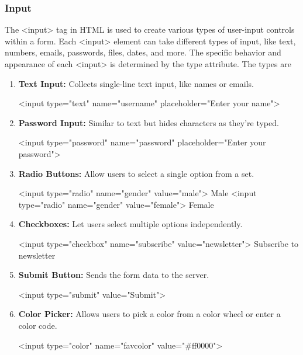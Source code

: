 \documentclass{report}
\begin{document}
\subsubsection{Input}
\bigbreak \noindent 
The <input> tag in HTML is used to create various types of user-input controls within a form. Each <input> element can take different types of input, like text, numbers, emails, passwords, files, dates, and more. The specific behavior and appearance of each <input> is determined by the type attribute.
\bigbreak \noindent 
The types are
\bigbreak \noindent 
        \begin{enumerate}
            \item \textbf{Text Input:} Collects single-line text input, like names or emails.
                \bigbreak \noindent 
                \begin{htmlcode}
                    <input type="text" name="username" placeholder="Enter your name">
                \end{htmlcode}
            \item \textbf{Password Input:} Similar to text but hides characters as they’re typed.
                \bigbreak \noindent 
                \begin{htmlcode}
                 <input type="password" name="password" placeholder="Enter your password">
                \end{htmlcode}
            \item \textbf{Radio Buttons:} Allow users to select a single option from a set.
                \bigbreak \noindent 
                \begin{htmlcode}
                    <input type="radio" name="gender" value="male"> Male
                    <input type="radio" name="gender" value="female"> Female
                \end{htmlcode}
            \item \textbf{Checkboxes:} Let users select multiple options independently.
                \bigbreak \noindent 
                \begin{htmlcode}
                 <input type="checkbox" name="subscribe" value="newsletter"> Subscribe to newsletter
                \end{htmlcode}
            \item \textbf{Submit Button:} Sends the form data to the server.
                \bigbreak \noindent 
                \begin{htmlcode}
                    <input type="submit" value="Submit">
                \end{htmlcode}
            \item \textbf{Color Picker:} Allows users to pick a color from a color wheel or enter a color code.
                \bigbreak \noindent 
                \begin{htmlcode}
                    <input type="color" name="favcolor" value="#ff0000">
                \end{htmlcode}
                

\end{enumerate}
\end{document}
